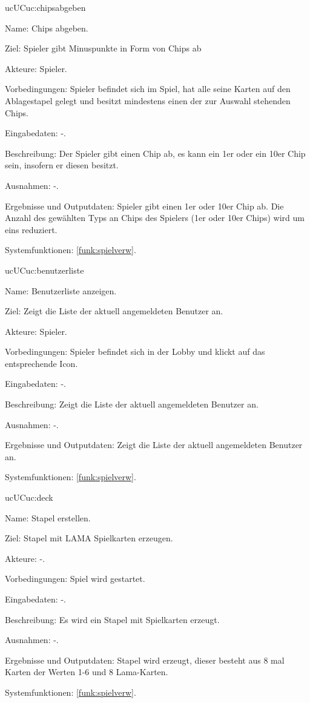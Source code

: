 \begin{description}[leftmargin=5em, style=sameline]
	\begin{lhp}{uc}{UC}{uc:chipsabgeben} 
		\item [Name:] Chips abgeben.
		\item [Ziel:] Spieler gibt Minuspunkte in Form von Chips ab
		\item [Akteure:] Spieler.
		\item [Vorbedingungen:] Spieler befindet sich im Spiel, hat alle seine Karten auf den Ablagestapel gelegt und besitzt mindestens einen der zur Auswahl stehenden Chips.
		\item [Eingabedaten:] -. 
		\item [Beschreibung:] Der Spieler gibt einen Chip ab, es kann ein 1er oder ein 10er Chip sein, insofern er diesen besitzt.
		\item [Ausnahmen:] -.
		\item [Ergebnisse und Outputdaten:] Spieler gibt einen 1er oder 10er Chip ab. Die Anzahl des gewählten Typs an Chips des Spielers (1er oder 10er Chips) wird um eins reduziert.
		\item [Systemfunktionen:] \ref{funk:spielverw}.
	\end{lhp}
	
		\begin{lhp}{uc}{UC}{uc:benutzerliste} 
		\item [Name:] Benutzerliste anzeigen.
		\item [Ziel:] Zeigt die Liste der aktuell angemeldeten Benutzer an.
		\item [Akteure:] Spieler.
		\item [Vorbedingungen:] Spieler befindet sich in der Lobby und klickt auf das entsprechende Icon.
		\item [Eingabedaten:] -. 
		\item [Beschreibung:] Zeigt die Liste der aktuell angemeldeten Benutzer an.
		\item [Ausnahmen:] -.
		\item [Ergebnisse und Outputdaten:] Zeigt die Liste der aktuell angemeldeten Benutzer an.	
		\item [Systemfunktionen:] \ref{funk:spielverw}.
	\end{lhp}

	\begin{lhp}{uc}{UC}{uc:deck} %
		\item [Name:] Stapel erstellen.
		\item [Ziel:] Stapel mit LAMA Spielkarten erzeugen.
		\item [Akteure:] -.
		\item [Vorbedingungen:] Spiel wird gestartet. 
		\item [Eingabedaten:] -.
		\item [Beschreibung:] Es wird ein Stapel mit Spielkarten erzeugt.
		\item [Ausnahmen:] -.
		\item [Ergebnisse und Outputdaten:] Stapel wird erzeugt, dieser besteht aus 8 mal Karten der Werten 1-6 und 8 Lama-Karten.
		\item [Systemfunktionen:] \ref{funk:spielverw}. %
	\end{lhp}


\end{description}
